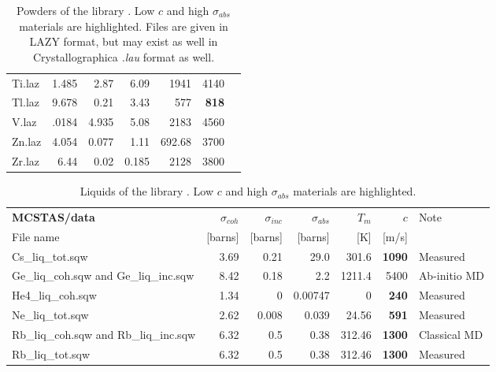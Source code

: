 \begin{table}
\begin{center}
{\begin{small}
\begin{tabular}{|l|rrr|rr|p{}|}
Ti.laz             & 1.485     & 2.87     &6.09      &1941      &4140&\\
Tl.laz             & 9.678     & 0.21     &3.43      &577       &{\bf 818}&\\
V.laz              & .0184     & 4.935    &5.08      &2183      &4560&\\
Zn.laz             & 4.054     & 0.077    &1.11      &692.68    &3700&\\
Zr.laz             & 6.44      & 0.02     &0.185     &2128      &3800&\\
      \hline
    \end{tabular}\end{small}
    \caption{Powders of the \MCS library \cite{icsd_ill,ILLblue}. Low $c$ and high $\sigma_{abs}$ materials are highlighted. Files are given in LAZY format, but may exist as well in Crystallographica {\it .lau} format as well.}
    \label{t:powders-data}
    }
  \end{center}
\end{table}

\begin{table}
  \begin{center}
    {\let\my=\\
    \begin{small}
    \begin{tabular}{|l|rrr|rr|p{}|}

      \hline
      {\bf MCSTAS/data} & $\sigma_{coh}$&$\sigma_{inc}$&$\sigma_{abs}$&$T_m$       & $c$    & Note \\
          File name     & [barns]     & [barns]    & [barns]    & [K]        & [m/s] & \\
      \hline
Cs\_liq\_tot.sqw                      & 3.69      & 0.21     &29.0      &301.6     &{\bf 1090}  & Measured \\
Ge\_liq\_coh.sqw and Ge\_liq\_inc.sqw & 8.42      & 0.18     &2.2       &1211.4    &5400  & Ab-initio MD \\
He4\_liq\_coh.sqw                     & 1.34      & 0        &0.00747   &0         &{\bf 240}   & Measured\\
Ne\_liq\_tot.sqw                      & 2.62      & 0.008    &0.039     &24.56     &{\bf 591}   & Measured\\
Rb\_liq\_coh.sqw and Rb\_liq\_inc.sqw & 6.32      & 0.5      &0.38      &312.46    &{\bf 1300}  & Classical MD \\
Rb\_liq\_tot.sqw                      & 6.32      & 0.5      &0.38      &312.46    &{\bf 1300}  & Measured \\
      \hline
    \end{tabular}\end{small}
    \caption{Liquids of the \MCS library \cite{icsd_ill,ILLblue}. Low $c$ and high $\sigma_{abs}$ materials are highlighted.}
    \label{t:liquids-data}
    }
  \end{center}
\end{table}

